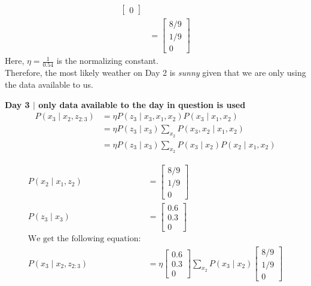 \documentclass[answers]{exam}
\begin{document}
\begin{questions}
\begin{parts}
\begin{solution}
\begin{align*}
\begin{bmatrix}
                    0
                \end{bmatrix} \\
                &= \begin{bmatrix}
                    8/9 \\
                    1/9 \\
                    0
                \end{bmatrix}
            \end{align*}
            Here, \(\eta = \frac{1}{0.54}\) is the normalizing constant. \\
            Therefore, the most likely weather on Day 2 is \textit{sunny} given that we are only using the data available to us.
            
            \textbf{Day 3 $\mid$ only data available to the day in question is used}
            \begin{align*}
                P(x_3 \mid x_2, z_{2:3}) &= \eta P(z_3 \mid x_3, x_1, x_2) P(x_3 \mid x_1, x_2) \\
                &= \eta P(z_3 \mid x_3) \sum_{x_2} P(x_3, x_2 \mid x_1, x_2) \\
                &= \eta P(z_3 \mid x_3) \sum_{x_2} P(x_3 \mid x_2) P(x_2 \mid x_1, x_2)
            \end{align*}
            
            \begin{align*}
                P(x_2 \mid x_1, z_2) &= \begin{bmatrix}
                    8/9 \\
                    1/9 \\
                    0
                \end{bmatrix} \\
                P(z_3 \mid x_3) &= \begin{bmatrix}
                    0.6 \\
                    0.3 \\
                    0
                \end{bmatrix} \\
                \text{We get the following equation:} \\
                P(x_3 \mid x_2, z_{2:3}) &= \eta \begin{bmatrix}
                    0.6 \\
                    0.3 \\
                    0
                \end{bmatrix} \sum_{x_2} P(x_3 \mid x_2) \begin{bmatrix}
                    8/9 \\
                    1/9 \\
                    0
                \end{bmatrix}
            \end{align*}
            

\end{solution}
\end{parts}
\end{questions}
\end{document}
